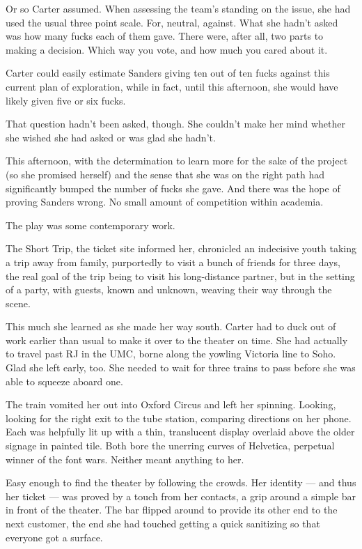 Or so Carter assumed. When assessing the team's standing on the issue, she had used the usual three point scale. For, neutral, against. What she hadn't asked was how many fucks each of them gave. There were, after all, two parts to making a decision. Which way you vote, and how much you cared about it.

Carter could easily estimate Sanders giving ten out of ten fucks against this current plan of exploration, while in fact, until this afternoon, she would have likely given five or six fucks.

That question hadn't been asked, though. She couldn't make her mind whether she wished she had asked or was glad she hadn't.

This afternoon, with the determination to learn more for the sake of the project (so she promised herself) and the sense that she was on the right path had significantly bumped the number of fucks she gave. And there was the hope of proving Sanders wrong. No small amount of competition within academia.

The play was some contemporary work.

The Short Trip, the ticket site informed her, chronicled an indecisive youth taking a trip away from family, purportedly to visit a bunch of friends for three days, the real goal of the trip being to visit his long-distance partner, but in the setting of a party, with guests, known and unknown, weaving their way through the scene.

This much she learned as she made her way south. Carter had to duck out of work earlier than usual to make it over to the theater on time. She had actually to travel past RJ in the UMC, borne along the yowling Victoria line to Soho. Glad she left early, too. She needed to wait for three trains to pass before she was able to squeeze aboard one.

The train vomited her out into Oxford Circus and left her spinning. Looking, looking for the right exit to the tube station, comparing directions on her phone. Each was helpfully lit up with a thin, translucent display overlaid above the older signage in painted tile. Both bore the unerring curves of Helvetica, perpetual winner of the font wars. Neither meant anything to her.

Easy enough to find the theater by following the crowds. Her identity — and thus her ticket — was proved by a touch from her contacts, a grip around a simple bar in front of the theater. The bar flipped around to provide its other end to the next customer, the end she had touched getting a quick sanitizing so that everyone got a surface.

